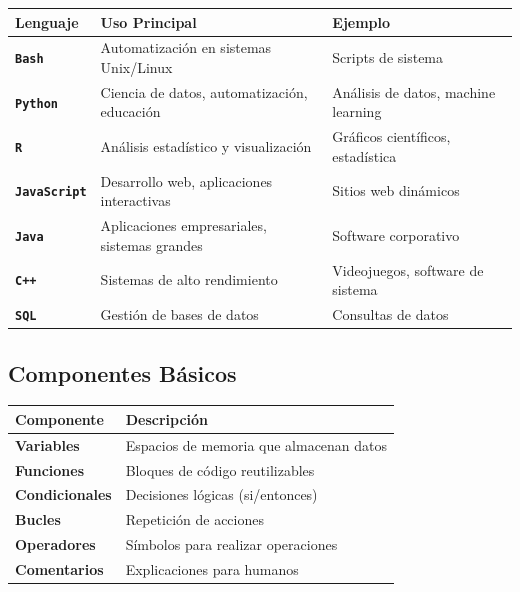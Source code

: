 \documentclass[
  spanish,
  12pt,
  letterpaper,
  DIV=11,
  numbers=noendperiod]{scrreprt}
\newcounter{none} %
\begin{document}
{\def\LTcaptype{none} %
\begin{longtable}[]{@{}
  >{\raggedright\arraybackslash}p{}
  >{\raggedright\arraybackslash}p{}
  >{\raggedright\arraybackslash}p{}@{}}
\toprule\noalign{}
\begin{minipage}[b]{\linewidth}\raggedright
Lenguaje
\end{minipage} & \begin{minipage}[b]{\linewidth}\raggedright
Uso Principal
\end{minipage} & \begin{minipage}[b]{\linewidth}\raggedright
Ejemplo
\end{minipage} \\
\midrule\noalign{}
\endhead
\bottomrule\noalign{}
\endlastfoot
\textbf{\texttt{Bash}} & Automatización en sistemas Unix/Linux & Scripts
de sistema \\
\textbf{\texttt{Python}} & Ciencia de datos, automatización, educación &
Análisis de datos, machine learning \\
\textbf{\texttt{R}} & Análisis estadístico y visualización & Gráficos
científicos, estadística \\
\textbf{\texttt{JavaScript}} & Desarrollo web, aplicaciones interactivas
& Sitios web dinámicos \\
\textbf{\texttt{Java}} & Aplicaciones empresariales, sistemas grandes &
Software corporativo \\
\textbf{\texttt{C++}} & Sistemas de alto rendimiento & Videojuegos,
software de sistema \\
\textbf{\texttt{SQL}} & Gestión de bases de datos & Consultas de
datos \\
\end{longtable}
}

\subsection{\texorpdfstring{\textbf{Componentes
Básicos}}{Componentes Básicos}}\label{componentes-buxe1sicos}

{\def\LTcaptype{none} %
\begin{longtable}[]{@{}ll@{}}
\toprule\noalign{}
Componente & Descripción \\
\midrule\noalign{}
\endhead
\bottomrule\noalign{}
\endlastfoot
\textbf{Variables} & Espacios de memoria que almacenan datos \\
\textbf{Funciones} & Bloques de código reutilizables \\
\textbf{Condicionales} & Decisiones lógicas (si/entonces) \\
\textbf{Bucles} & Repetición de acciones \\
\textbf{Operadores} & Símbolos para realizar operaciones \\
\textbf{Comentarios} & Explicaciones para humanos \\
\end{longtable}
}
\end{document}
